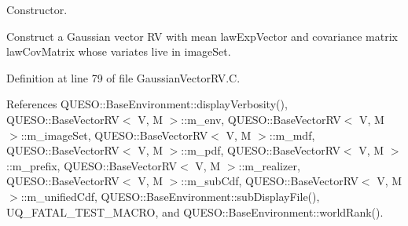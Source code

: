 Constructor. 

Construct a Gaussian vector R\-V with mean {\ttfamily law\-Exp\-Vector} and covariance matrix {\ttfamily law\-Cov\-Matrix} whose variates live in {\ttfamily image\-Set}. 

Definition at line 79 of file Gaussian\-Vector\-R\-V.\-C.



References Q\-U\-E\-S\-O\-::\-Base\-Environment\-::display\-Verbosity(), Q\-U\-E\-S\-O\-::\-Base\-Vector\-R\-V$<$ V, M $>$\-::m\-\_\-env, Q\-U\-E\-S\-O\-::\-Base\-Vector\-R\-V$<$ V, M $>$\-::m\-\_\-image\-Set, Q\-U\-E\-S\-O\-::\-Base\-Vector\-R\-V$<$ V, M $>$\-::m\-\_\-mdf, Q\-U\-E\-S\-O\-::\-Base\-Vector\-R\-V$<$ V, M $>$\-::m\-\_\-pdf, Q\-U\-E\-S\-O\-::\-Base\-Vector\-R\-V$<$ V, M $>$\-::m\-\_\-prefix, Q\-U\-E\-S\-O\-::\-Base\-Vector\-R\-V$<$ V, M $>$\-::m\-\_\-realizer, Q\-U\-E\-S\-O\-::\-Base\-Vector\-R\-V$<$ V, M $>$\-::m\-\_\-sub\-Cdf, Q\-U\-E\-S\-O\-::\-Base\-Vector\-R\-V$<$ V, M $>$\-::m\-\_\-unified\-Cdf, Q\-U\-E\-S\-O\-::\-Base\-Environment\-::sub\-Display\-File(), U\-Q\-\_\-\-F\-A\-T\-A\-L\-\_\-\-T\-E\-S\-T\-\_\-\-M\-A\-C\-R\-O, and Q\-U\-E\-S\-O\-::\-Base\-Environment\-::world\-Rank().


